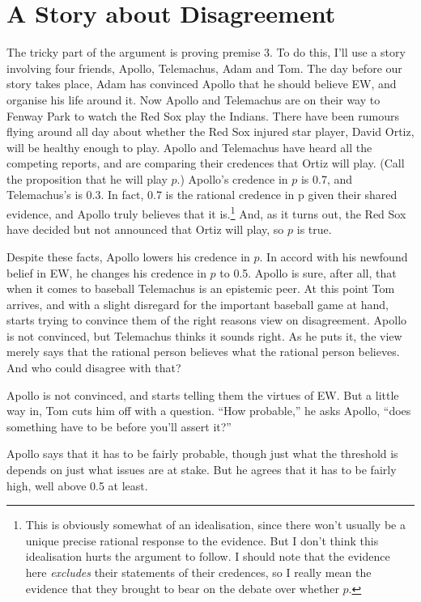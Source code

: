 \section{A Story about Disagreement}
The tricky part of the argument is proving premise 3. To do this, I'll use a story involving four friends, Apollo, Telemachus, Adam and Tom. The day before our story takes place, Adam has convinced Apollo that he should believe EW, and organise his life around it. Now Apollo and Telemachus are on their way to Fenway Park to watch the Red Sox play the Indians. There have been rumours flying around all day about whether the Red Sox injured star player, David Ortiz, will be healthy enough to play. Apollo and Telemachus have heard all the competing reports, and are comparing their credences that Ortiz will play. (Call the proposition that he will play $p$.) Apollo's credence in $p$ is 0.7, and Telemachus's is 0.3. In fact, 0.7 is the rational credence in p given their shared evidence, and Apollo truly believes that it is.\footnote{This is obviously somewhat of an idealisation, since there won't usually be a unique precise rational response to the evidence. But I don't think this idealisation hurts the argument to follow. I should note that the evidence here \textit{excludes} their statements of their credences, so I really mean the evidence that they brought to bear on the debate over whether $p$.}  And, as it turns out, the Red Sox have decided but not announced that Ortiz will play, so $p$ is true.

Despite these facts, Apollo lowers his credence in $p$. In accord with his newfound belief in EW, he changes his credence in $p$ to 0.5. Apollo is sure, after all, that when it comes to baseball Telemachus is an epistemic peer. At this point Tom arrives, and with a slight disregard for the important baseball game at hand, starts trying to convince them of the right reasons view on disagreement. Apollo is not convinced, but Telemachus thinks it sounds right. As he puts it, the view merely says that the rational person believes what the rational person believes. And who could disagree with that?

Apollo is not convinced, and starts telling them the virtues of EW. But a little way in, Tom cuts him off with a question. ``How probable,'' he asks Apollo, ``does something have to be before you'll assert it?'' 

Apollo says that it has to be fairly probable, though just what the threshold is depends on just what issues are at stake.  But he agrees that it has to be fairly high, well above 0.5 at least.

